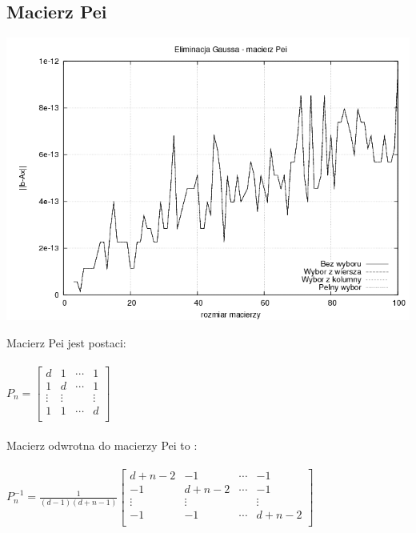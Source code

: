 \documentclass[a4paper,10pt]{article}
\begin{document}
    \subsection{Macierz Pei}
        \begin{center}
            \includegraphics[width=140mm]{pei_plot.png}
        \end{center}
            Macierz Pei jest postaci:\\
        \\
        $P_{n} = \left[ \begin{array}{ccccccccc}
	    d & 1 & \cdots & 1\\
	    1 & d & \cdots & 1\\
	    \vdots & \vdots & & \vdots \\
	    1 & 1 & \cdots & d\\
       \end{array} \right] $\\
        \\
            Macierz odwrotna do macierzy Pei to \cite{Wa}: \\
        \\
        $P_{n}^{-1} = \frac{1}{(d-1)(d+n-1)} \left[ \begin{array}{ccccccccc}
	    d+n-2 & -1 & \cdots & -1\\
	    -1 & d+n-2 & \cdots & -1\\
	    \vdots & \vdots & & \vdots \\
	    -1 & -1 & \cdots & d+n-2\\
       \end{array} \right] $\\
        \\
\end{document}
